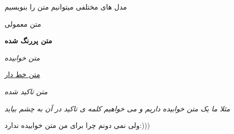 \documentclass{article}
\begin{document}
مدل های مختلفی میتوانیم متن را بنویسیم

\textrm{متن معمولی}

\textbf{متن پررنگ شده}

\textit{متن خوابیده}

\underline{متن خط دار}


\emph{متن تاکید شده}

\textit{مثلا ما یک متن خوابیده داریم و می خواهیم کلمه ی \emph{تاکید} در آن به چشم بیاید}

ولی نمی دونم چرا برای من متن خوابیده ندارد:)))
\end{document}
